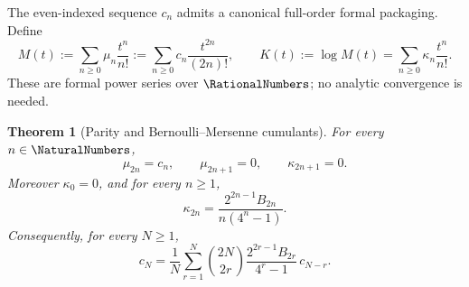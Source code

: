 \documentclass[11pt,oneside]{article}
\newtheorem{theorem}{Theorem}[section]
\theoremstyle{definition}
\theoremstyle{remark}
\begin{document}
The even-indexed sequence $c_n$ admits a canonical full-order formal packaging.  Define
\begin{equation}
 M(t):=\sum_{n\ge0}\mu_n\frac{t^n}{n!}
      :=\sum_{n\ge0}c_n\frac{t^{2n}}{(2n)!},
 \qquad
 K(t):=\log M(t)=\sum_{n\ge0}\kappa_n\frac{t^n}{n!}.       \label{eq:centered-full-moment-cumulant-series}
\end{equation}
These are formal power series over $\RationalNumbers$; no analytic convergence is needed.

\begin{theorem}[Parity and Bernoulli--Mersenne cumulants]
\label{thm:centered-full-cumulants}
For every $n\in\NaturalNumbers$,
\begin{equation}
 \mu_{2n}=c_n,\qquad \mu_{2n+1}=0,\qquad \kappa_{2n+1}=0. \label{eq:centered-full-parity}
\end{equation}
Moreover $\kappa_0=0$, and for every $n\ge1$,
\begin{equation}
 \boxed{
 \kappa_{2n}=\frac{2^{2n-1}B_{2n}}{n(4^n-1)}.}             \label{eq:centered-bernoulli-mersenne-cumulant}
\end{equation}
Consequently, for every $N\ge1$,
\begin{equation}
 c_N=\frac1N\sum_{r=1}^{N}
   \binom{2N}{2r}\frac{2^{2r-1}B_{2r}}{4^r-1}\,c_{N-r}.   \label{eq:centered-bernoulli-mersenne-recurrence}
\end{equation}
\end{theorem}
\end{document}
